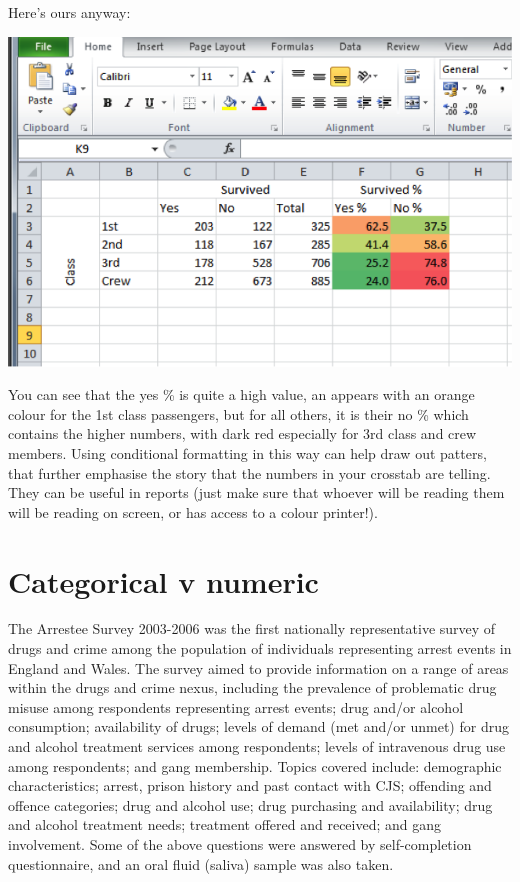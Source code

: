 \documentclass[
]{book}
\begin{document}
Here's ours anyway:

\includegraphics{imgs/cond_form_3.png}

You can see that the yes \% is quite a high value, an appears with an orange colour for the 1st class passengers, but for all others, it is their no \% which contains the higher numbers, with dark red especially for 3rd class and crew members. Using conditional formatting in this way can help draw out patters, that further emphasise the story that the numbers in your crosstab are telling. They can be useful in reports (just make sure that whoever will be reading them will be reading on screen, or has access to a colour printer!).

\hypertarget{categorical-v-numeric}{%
\section{Categorical v numeric}\label{categorical-v-numeric}}

The Arrestee Survey 2003-2006 was the first nationally representative survey of drugs and crime among the population of individuals representing arrest events in England and Wales. The survey aimed to provide information on a range of areas within the drugs and crime nexus, including the prevalence of problematic drug misuse among respondents representing arrest events; drug and/or alcohol consumption; availability of drugs; levels of demand (met and/or unmet) for drug and alcohol treatment services among respondents; levels of intravenous drug use among respondents; and gang membership. Topics covered include: demographic characteristics; arrest, prison history and past contact with CJS; offending and offence categories; drug and alcohol use; drug purchasing and availability; drug and alcohol treatment needs; treatment offered and received; and gang involvement. Some of the above questions were answered by self-completion questionnaire, and an oral fluid (saliva) sample was also taken.
\end{document}
